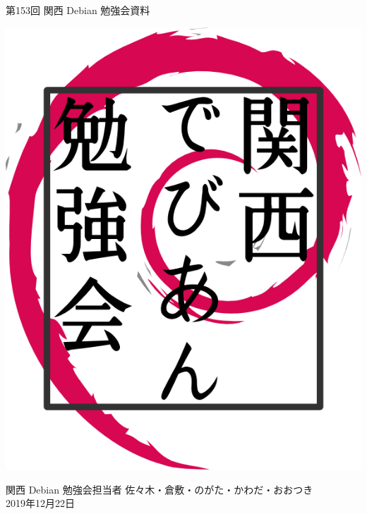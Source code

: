 \documentclass[mingoth,a4paper]{jsarticle}
\newcommand{\debmtgyear}{2019}
\newcommand{\debmtgdate}{22}
\newcommand{\debmtgmonth}{12}
\newcommand{\debmtgnumber}{153}
\begin{document}
\begin{titlepage}


 第\debmtgnumber{}回 関西 Debian 勉強会資料

\vspace{2cm}

\begin{center}
\includegraphics[width=.99\linewidth,clip]{image200802/kansaidebianlogo.png}
\end{center}

\begin{flushright}
\hfill{}関西 Debian 勉強会担当者 佐々木・倉敷・のがた・かわだ・おおつき \\
\hfill{}\debmtgyear{}年\debmtgmonth{}月\debmtgdate{}日
\end{flushright}

\thispagestyle{empty}
\end{titlepage}

\end{document}
